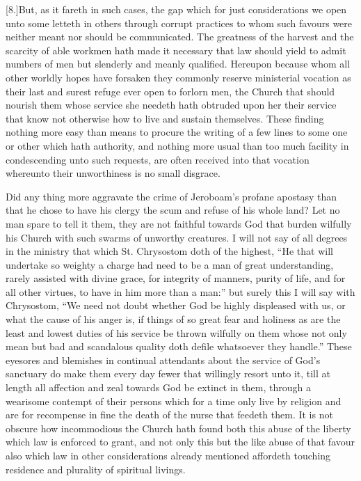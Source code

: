 [8.]But, as it fareth in such cases, the gap which for just  considerations we open unto some letteth in others through corrupt practices to whom such favours were neither meant nor should be communicated.
 The greatness of the harvest and the scarcity of able workmen hath made it necessary that law should yield to admit numbers of men but slenderly and meanly qualified. Hereupon because whom all other worldly hopes have forsaken they commonly reserve ministerial vocation as their last and surest refuge ever open to forlorn men, the Church that should nourish them whose service she needeth hath obtruded upon her their service that know not otherwise how to live and sustain themselves. These finding nothing more easy than means to procure the writing of a few lines to some one or other which hath authority, and nothing more usual than too much facility in condescending unto such requests, are often received into that vocation whereunto their unworthiness is no small disgrace.

Did any thing more aggravate the crime of Jeroboam’s profane apostasy than that he chose to have his clergy the scum and refuse of his whole land? Let no man spare to tell it them, they are not faithful towards God that burden wilfully his Church with such swarms of unworthy creatures. I will not say of all degrees in the ministry that which St. Chrysostom doth of the highest, “He that will undertake so weighty a charge had need to be a man of great understanding, rarely assisted with divine grace, for integrity of manners, purity of life, and for all other virtues, to have in him more than a man:” but surely this I will say with Chrysostom, “We need not doubt whether God be highly displeased with us, or what the cause of his anger is, if things of so great fear and holiness as are the least and lowest duties of his service be thrown wilfully on them whose not only mean but bad and scandalous quality doth defile whatsoever they  handle.”
 These eyesores and blemishes in continual attendants about the service of God’s sanctuary do make them every day fewer that willingly resort unto it, till at length all affection and zeal towards God be extinct in them, through a wearisome contempt of their persons which for a time only live by religion and are for recompense in fine the death of the nurse that feedeth them. It is not obscure how incommodious the Church hath found both this abuse of the liberty which law is enforced to grant, and not only this but the like abuse of that favour also which law in other considerations already mentioned affordeth touching residence and plurality of spiritual livings.

